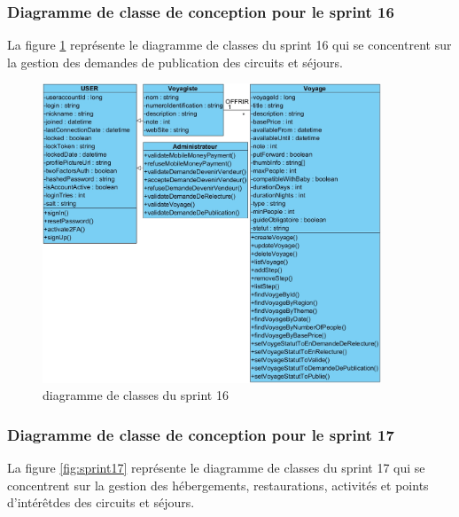 \documentclass[12pt]{report}
\begin{document}
			\subsubsection{Diagramme de classe de conception pour le sprint 16}
				
			\hspace{15pt} La figure \ref{fig:sprint16} représente le diagramme de classes du sprint 16 qui se concentrent sur la gestion des demandes de publication des circuits et séjours.


			\begin{figure}[h]
				\centering
				\includegraphics[width=0.9\textwidth]{sprint16.jpg}
				\caption{diagramme de classes du sprint 16}
				\label{fig:sprint16}
			\end{figure}
			\FloatBarrier


			\subsubsection{Diagramme de classe de conception pour le sprint 17}
				
			\hspace{15pt} La figure \ref{fig:sprint17} représente le diagramme de classes du sprint 17 qui se concentrent sur la gestion des hébergements, restaurations, activités et points d’intérêtdes des circuits et séjours.
\end{document}
